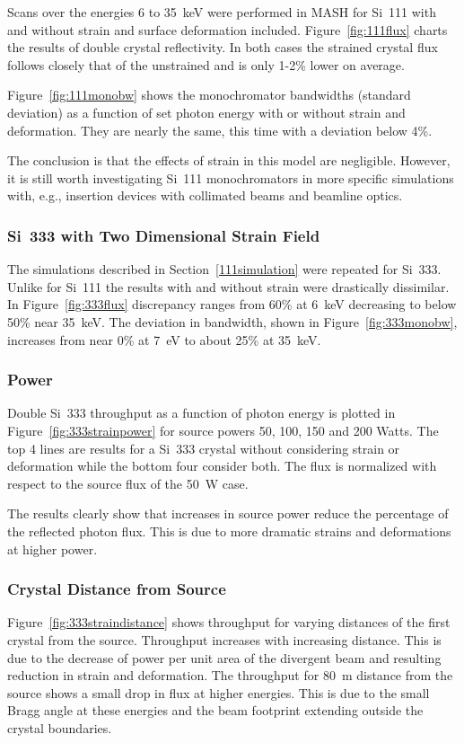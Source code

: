 \documentclass[preprint]{iucr}              %
\begin{document}
Scans over the energies 6 to 35~keV were performed in MASH for Si~111 with and without strain and surface deformation included. Figure~\ref{fig:111flux} charts the results of double crystal reflectivity. In both cases the strained crystal flux follows closely that of the unstrained and is only 1-2\% lower on average.

Figure~\ref{fig:111monobw} shows the monochromator bandwidths (standard deviation) as a function of set photon energy with or without strain and deformation. They are nearly the same, this time with a deviation below 4\%.

The conclusion is that the effects of strain in this model are negligible. However, it is still worth investigating Si~111 monochromators in more specific simulations with, e.g., insertion devices with collimated beams and beamline optics.

\subsubsection{Si~333 with Two Dimensional Strain Field}\label{parameterscans}

The simulations described in Section~\ref{111simulation} were repeated for Si~333. Unlike for Si~111 the results with and without strain were drastically dissimilar. In Figure~\ref{fig:333flux} discrepancy ranges from 60\% at 6~keV decreasing to below 50\% near 35~keV. The deviation in bandwidth, shown in Figure~\ref{fig:333monobw}, increases from near 0\% at 7~eV to about 25\% at 35~keV.

\subsubsection{Power}
Double Si~333 throughput as a function of photon energy is plotted in Figure~\ref{fig:333strainpower} for source powers 50, 100, 150 and 200 Watts. The top 4 lines are results for a Si~333 crystal without considering strain or deformation while the bottom four consider both. The flux is normalized with respect to the source flux of the 50~W case.

The results clearly show that increases in source power reduce the percentage of the reflected photon flux. This is due to more dramatic strains and deformations at higher power.

\subsubsection{Crystal Distance from Source}
Figure~\ref{fig:333straindistance} shows throughput for varying distances of the first crystal from the source. Throughput increases with increasing distance. This is due to the decrease of power per unit area of the divergent beam and resulting reduction in strain and deformation. The throughput for 80~m distance from the source shows a small drop in flux at higher energies. This is due to the small Bragg angle at these energies and the beam footprint extending outside the crystal boundaries.
\end{document}

